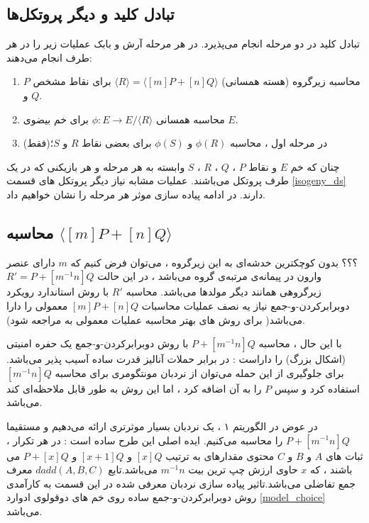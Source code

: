 \documentclass[12pt,a4paper]{article}
\begin{document}
 \newpage
 \subsection{\bf تبادل کلید و دیگر پروتکل‌ها}\label{key_exchange}
 
 تبادل کلید در دو مرحله انجام می‌پذیرد. در هر مرحله آرش و بابک عملیات زیر را در هر طرف انجام می‌دهند:
 \begin{enumerate}
 	\item
 	محاسبه زیرگروه (هسته همسانی) 
 	$\langle R \rangle = \langle [m]P + [n]Q \rangle $
 	برای نقاط مشخص
 	$P$
 	و
 	$Q$.
 	
 	\item
 	محاسبه همسانی  
 	$\phi : E \rightarrow E/ \langle R \rangle $
 	برای خم بیضوی
 	$E$.
 	
 	\item 
 	(فقط)در مرحله اول ، محاسبه
 	$\phi(R)$
 	و
 	$\phi(S)$
 	برای بعضی نقاط
 	$R$
 	و
 	$S$؛
 \end{enumerate}
چنان که خم 
$E$
و نقاط
$P$
،
$Q$
،
$R$
،
$S$
وابسته به هر مرحله و هر بازیکنی که در یک طرف پروتکل می‌باشند.
عملیات مشابه نیاز دیگر پروتکل های قسمت 
\ref{isogeny_ds}
 دارند. در ادامه پیاده سازی موثر هر مرحله را نشان خواهیم داد.

\subsection{\bf 
محاسبه 
$\langle [m]P + [n] Q \rangle $
}\label{computing_kernel}
؟؟؟
بدون کوچکترین خدشه‌ای به این زیرگروه ، می‌توان فرض کنیم که 
$m$
دارای عنصر وارون در پیمانه‌ی مرتبه‌ی گروه می‌باشد ، در این حالت 
$R' = P + [m^{-1}n]Q$
زیرگروهی همانند دیگر مولدها می‌باشد. محاسبه 
$R'$
با روش استاندارد رویکرد دوبرابرکردن-و-جمع 
نیاز یه نصف عملیات محاسبات
$[m]P + [n]Q$
معمولی را دارا می‌باشد( برای روش های بهتر محاسبه عملیات معمولی به مراجعه 
\cite{ antipa, elgamal, solinas}
شود).

با این حال ،  محاسبه 
$P + [m^{-1}n]Q$
با روش دوبرابرکردن-و-جمع یک حفره امنیتی (اشکال بزرگ) را داراست : در برابر حملات آنالیز قدرت ساده 
\cite{spa}
آسیب پذیر می‌باشد. برای جلوگیری از این حمله می‌توان از نردبان مونتگومری
\cite{montgomery}
برای محاسبه 
$[m^{-1}n]Q$ 
استفاده کرد و سپس 
$P$
را به آن اضافه کرد ، اما این روش به طور قابل ملاحظه‌ای کند می‌باشد.

در عوض در الگوریتم ۱ ، یک نردبان بسیار موثرتری ارائه می‌دهیم و مستقیما 
$P + [m^{-1}n]Q$
را محاسبه می‌کنیم. ایده اصلی این طرح ساده است : در هر تکرار ، ثبات های 
$A$
و
$B$
و
$C$
محتوی مقدارهای به ترتیب
$[x]Q$
و
$[x+1]Q$
و
$P+[x]Q$
می ‌باشند ، که 
$x$
حاوی ارزش چپ ترین بیت
$m^{-1}n$
می‌باشد.تابع 
$dadd(A,B,C)$
معرف جمع تفاضلی 
\cite{montgomery}
می‌باشد.تاثیر پیاده سازی نردبان معرفی شده در این قسمت به کارآمدی روش دوبرابرکردن-و-جمع ساده روی خم های دوقولوی ادوارد
\ref{model_choice}
می‌باشد.
\end{document}
